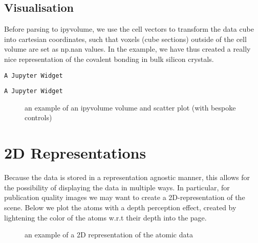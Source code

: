 \documentclass[10pt,parskip=half,
	toc=sectionentrywithdots,
	bibliography=totocnumbered,
	captions=tableheading,numbers=noendperiod]{scrartcl}
\begin{document}
\subsection{Visualisation}\label{visualisation}

Before parsing to ipyvolume, we use the cell vectors to transform the
data cube into cartesian coordinates, such that voxels (cube sections)
outside of the cell volume are set as np.nan values. In the example, we
have thus created a really nice representation of the covalent bonding
in bulk silicon crystals.

\begin{lstlisting}[language={},postbreak={},numbers=none,xrightmargin=7pt,breakindent=0pt,aboveskip=5pt,belowskip=5pt]
A Jupyter Widget
\end{lstlisting}

\begin{lstlisting}[language={},postbreak={},numbers=none,xrightmargin=7pt,breakindent=0pt,aboveskip=5pt,belowskip=5pt]
A Jupyter Widget
\end{lstlisting}

\begin{figure}[H]\begin{center}\end{center}\caption{an example of an ipyvolume volume and scatter plot (with bespoke controls)}\label{fig:ipyvol3}
    \end{figure}

\section{2D Representations}\label{d-representations}

Because the data is stored in a representation agnostic manner, this
allows for the possibility of displaying the data in multiple ways. In
particular, for publication quality images we may want to create a
2D-representation of the scene. Below we plot the atoms with a depth
perception effect, created by lightening the color of the atoms w.r.t
their depth into the page.

\begin{figure}[H]\begin{center}\end{center}\caption{an example of a 2D representation of the atomic data}\label{fig:mpl1}
    \end{figure}
\end{document}
